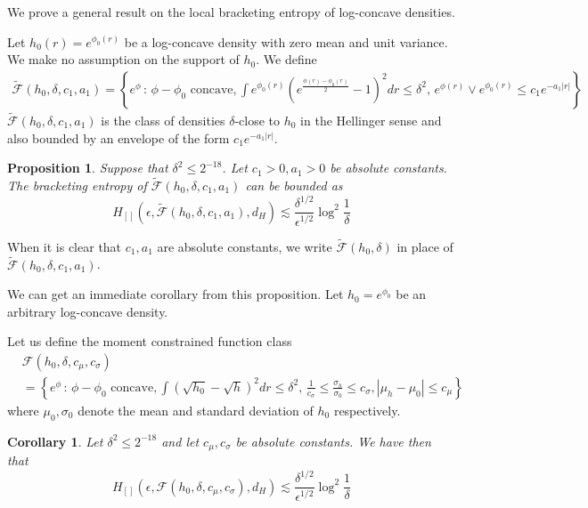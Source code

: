 \documentclass[12pt]{article}
\newtheorem{proposition}[theorem]{Proposition}
\newtheorem{corollary}[theorem]{Corollary}
\begin{document}
We prove a general result on the local bracketing entropy of log-concave densities.

Let $h_0(r) = e^{\phi_0(r)}$ be a log-concave density with zero mean and unit variance. We make no assumption on the support of $h_0$. We define
\begin{align}
  \tilde{\mathcal{F}}(h_0, \delta, c_1, a_1) = \left\{ e^{\phi} \,:\, \phi - \phi_0 \textrm{ concave},
    \int e^{\phi_0(r)} \left( e^{\frac{\phi(r) - \phi_0(r)}{2}} - 1 \right)^2 dr \leq \delta^2,\,
      e^{\phi(r)} \vee e^{\phi_0(r)} \leq c_1 e^{-a_1|r|}  \right\} \label{eqn:local_density_ball_envelope}
\end{align}
$\tilde{\mathcal{F}}(h_0, \delta, c_1, a_1)$ is the class of densities $\delta$-close to $h_0$ in the Hellinger sense and also bounded by an envelope of the form $c_1 e^{-a_1|r|}$.

\begin{proposition}
  \label{Prop:GeneralLocalBracketing}
  Suppose that $\delta^2 \leq 2^{-18}$. Let $c_1 > 0, a_1 > 0$ be absolute constants. The bracketing entropy of $\tilde{\mathcal{F}}(h_0, \delta, c_1, a_1)$ can be bounded as
  \[
    H_{[]}(\epsilon, \tilde{\mathcal{F}}(h_0, \delta, c_1, a_1), d_H) \lesssim \frac{\delta^{1/2}}{\epsilon^{1/2}} \log^{2} \frac{1}{\delta}
  \]
  
\end{proposition}
When it is clear that $c_1, a_1$ are absolute constants, we write $\tilde{\mathcal{F}}(h_0, \delta)$ in place of $\tilde{\mathcal{F}}(h_0, \delta, c_1, a_1)$.

We can get an immediate corollary from this proposition. Let $h_0 = e^{\phi_0}$ be an arbitrary log-concave density.

Let us define the moment constrained function class
\begin{align}
  &\mathcal{F}(h_0, \delta, c_\mu, c_\sigma) \\
  &= \left\{ e^\phi \,:\, \phi - \phi_0 \textrm{ concave},
    \int \left( \sqrt{h_0} - \sqrt{h} \right)^2 dr \leq \delta^2,\,
  \frac{1}{c_\sigma} \leq \frac{\sigma_h}{\sigma_0} \leq c_\sigma,
  |\mu_h - \mu_0 | \leq c_\mu \right\} \label{eqn:local_density_ball_moment}
\end{align}
where $\mu_0, \sigma_0$ denote the mean and standard deviation of $h_0$ respectively.

\begin{corollary}
  \label{Cor:GeneralLocalBracketingMoment}
  Let $\delta^2 \leq 2^{-18}$ and let $c_\mu, c_\sigma$ be absolute constants. We have then that
  \[
    H_{[]}(\epsilon, \mathcal{F}(h_0, \delta, c_\mu, c_\sigma), d_H) \lesssim
     \frac{\delta^{1/2}}{\epsilon^{1/2}} \log^2 \frac{1}{\delta}
  \]
  
\end{corollary}
\end{document}
